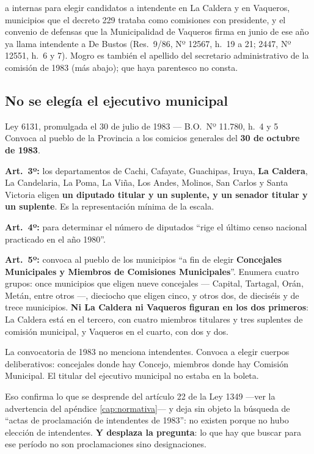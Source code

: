 a internas para elegir candidatos a intendente en La Caldera y en Vaqueros, municipios que el decreto 229 trataba como comisiones con presidente, y el convenio de defensas que la Municipalidad de Vaqueros firma en junio de ese año ya llama intendente a De Bustos (Res.\ 9/86, Nº 12567, h.\ 19 a 21; 2447, Nº 12551, h.\ 6 y 7). Mogro es también el apellido del secretario administrativo de la comisión de 1983 (más abajo); que haya parentesco no consta.

\subsection*{No se elegía el ejecutivo municipal}

\begin{ficha}{Ley 6131, promulgada el 30 de julio de 1983 --- B.O.\ Nº 11.780, h.\ 4 y 5}
Convoca al pueblo de la Provincia a los comicios generales del \textbf{30 de octubre de 1983}.

\textbf{Art.\ 3º:} los departamentos de Cachi, Cafayate, Guachipas, Iruya, \textbf{La Caldera}, La Candelaria, La Poma, La Viña, Los Andes, Molinos, San Carlos y Santa Victoria eligen \textbf{un diputado titular y un suplente, y un senador titular y un suplente}. Es la representación mínima de la escala.

\textbf{Art.\ 4º:} para determinar el número de diputados ``rige el último censo nacional practicado en el año 1980''.

\textbf{Art.\ 5º:} convoca al pueblo de los municipios ``a fin de elegir \textbf{Concejales Municipales y Miembros de Comisiones Municipales}''. Enumera cuatro grupos: once municipios que eligen nueve concejales --- Capital, Tartagal, Orán, Metán, entre otros ---, dieciocho que eligen cinco, y otros dos, de dieciséis y de trece municipios. \textbf{Ni La Caldera ni Vaqueros figuran en los dos primeros}: La Caldera está en el tercero, con cuatro miembros titulares y tres suplentes de comisión municipal, y Vaqueros en el cuarto, con dos y dos.
\end{ficha}

La convocatoria de 1983 no menciona intendentes. Convoca a elegir cuerpos deliberativos: concejales donde hay Concejo, miembros donde hay Comisión Municipal. El titular del ejecutivo municipal no estaba en la boleta.

Eso confirma lo que se desprende del artículo 22 de la Ley 1349 ---ver la advertencia del apéndice \ref{cap:normativa}--- y deja sin objeto la búsqueda de ``actas de proclamación de intendentes de 1983'': no existen porque no hubo elección de intendentes. \textbf{Y desplaza la pregunta}: lo que hay que buscar para ese período no son proclamaciones sino designaciones.

